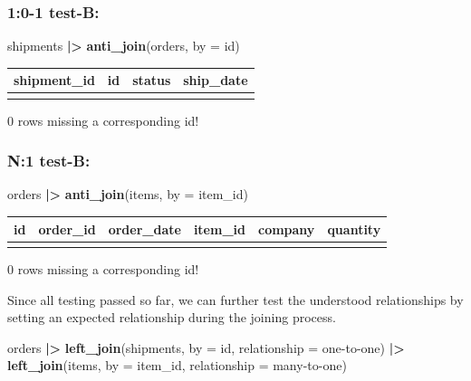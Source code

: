 \documentclass[
]{article}
\newenvironment{Shaded}{\begin{snugshade}}{\end{snugshade}}
\newcommand{\AttributeTok}[1]{\textcolor[rgb]{0.13,0.29,0.53}{#1}}
\newcommand{\FunctionTok}[1]{\textcolor[rgb]{0.13,0.29,0.53}{\textbf{#1}}}
\newcommand{\NormalTok}[1]{#1}
\newcommand{\SpecialCharTok}[1]{\textcolor[rgb]{0.81,0.36,0.00}{\textbf{#1}}}
\newcommand{\StringTok}[1]{\textcolor[rgb]{0.31,0.60,0.02}{#1}}
\newcounter{none} %
\begin{document}
\subsubsection{1:0-1 test-B:}\label{test-b}

\begin{Shaded}
\begin{Highlighting}[]
\NormalTok{shipments }\SpecialCharTok{|\textgreater{}} \FunctionTok{anti\_join}\NormalTok{(orders, }\AttributeTok{by =} \StringTok{\textquotesingle{}id\textquotesingle{}}\NormalTok{) }
\end{Highlighting}
\end{Shaded}

{\def\LTcaptype{none} %
\begin{longtable}[]{@{}rrll@{}}
\toprule\noalign{}
shipment\_id & id & status & ship\_date \\
\midrule\noalign{}
\endhead
\bottomrule\noalign{}
\endlastfoot
\end{longtable}
}

0 rows missing a corresponding id!

\subsubsection{N:1 test-B:}\label{n1-test-b}

\begin{Shaded}
\begin{Highlighting}[]
\NormalTok{orders }\SpecialCharTok{|\textgreater{}} \FunctionTok{anti\_join}\NormalTok{(items, }\AttributeTok{by =} \StringTok{\textquotesingle{}item\_id\textquotesingle{}}\NormalTok{)}
\end{Highlighting}
\end{Shaded}

{\def\LTcaptype{none} %
\begin{longtable}[]{@{}rrlrlr@{}}
\toprule\noalign{}
id & order\_id & order\_date & item\_id & company & quantity \\
\midrule\noalign{}
\endhead
\bottomrule\noalign{}
\endlastfoot
\end{longtable}
}

0 rows missing a corresponding id!

Since all testing passed so far, we can further test the understood
relationships by setting an expected relationship during the joining
process.

\begin{Shaded}
\begin{Highlighting}[]
\NormalTok{orders }\SpecialCharTok{|\textgreater{}} 
  \FunctionTok{left\_join}\NormalTok{(shipments, }\AttributeTok{by =} \StringTok{\textquotesingle{}id\textquotesingle{}}\NormalTok{, }\AttributeTok{relationship =} \StringTok{\textquotesingle{}one{-}to{-}one\textquotesingle{}}\NormalTok{) }\SpecialCharTok{|\textgreater{}}
  \FunctionTok{left\_join}\NormalTok{(items, }\AttributeTok{by =} \StringTok{\textquotesingle{}item\_id\textquotesingle{}}\NormalTok{, }\AttributeTok{relationship =} \StringTok{\textquotesingle{}many{-}to{-}one\textquotesingle{}}\NormalTok{)}
\end{Highlighting}
\end{Shaded}
\end{document}
